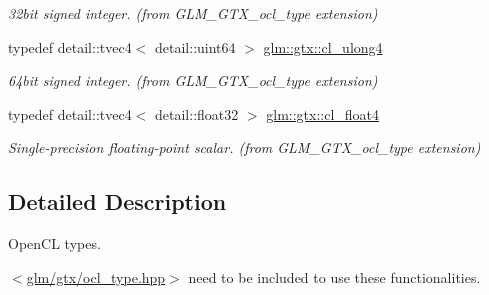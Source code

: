 \begin{DoxyCompactItemize}
\begin{DoxyCompactList}\small\item\em 32bit signed integer. (from G\+L\+M\+\_\+\+G\+T\+X\+\_\+ocl\+\_\+type extension) \end{DoxyCompactList}\item 
\hypertarget{group__gtx__ocl__type_gaeacce8f6f5fa6e1c1e240434a9ce4aa6}{}typedef detail\+::tvec4$<$ detail\+::uint64 $>$ \hyperlink{group__gtx__ocl__type_gaeacce8f6f5fa6e1c1e240434a9ce4aa6}{glm\+::gtx\+::cl\+\_\+ulong4}\label{group__gtx__ocl__type_gaeacce8f6f5fa6e1c1e240434a9ce4aa6}

\begin{DoxyCompactList}\small\item\em 64bit signed integer. (from G\+L\+M\+\_\+\+G\+T\+X\+\_\+ocl\+\_\+type extension) \end{DoxyCompactList}\item 
\hypertarget{group__gtx__ocl__type_ga2940d6856ff79a7a984d0e8edcbe0c9e}{}typedef detail\+::tvec4$<$ detail\+::float32 $>$ \hyperlink{group__gtx__ocl__type_ga2940d6856ff79a7a984d0e8edcbe0c9e}{glm\+::gtx\+::cl\+\_\+float4}\label{group__gtx__ocl__type_ga2940d6856ff79a7a984d0e8edcbe0c9e}

\begin{DoxyCompactList}\small\item\em Single-\/precision floating-\/point scalar. (from G\+L\+M\+\_\+\+G\+T\+X\+\_\+ocl\+\_\+type extension) \end{DoxyCompactList}\end{DoxyCompactItemize}


\subsection{Detailed Description}
Open\+C\+L types. 

$<$\hyperlink{ocl__type_8hpp}{glm/gtx/ocl\+\_\+type.\+hpp}$>$ need to be included to use these functionalities. 